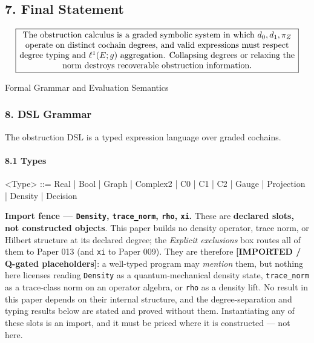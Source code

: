 \documentclass[
]{article}
\newenvironment{Shaded}{\begin{snugshade}}{\end{snugshade}}
\newcommand{\NormalTok}[1]{\textcolor[rgb]{0.12,0.11,0.11}{#1}}
\renewenvironment{quote}
  {\begin{leftbar}\small}
  {\end{leftbar}}
\begin{document}
\subsection{7. Final Statement}\label{final-statement}

\[
\fbox{\parbox{0.95\textwidth}{\centering The obstruction calculus is a graded symbolic system in which $d_0, d_1, \pi_Z$ operate on distinct cochain degrees, and valid expressions must respect degree typing and $\ell^1(E; g)$ aggregation. Collapsing degrees or relaxing the norm destroys recoverable obstruction information.}}
\]

Formal Grammar and Evaluation Semantics

\subsubsection{8. DSL Grammar}\label{dsl-grammar}

The obstruction DSL is a typed expression language over graded cochains.

\paragraph{8.1 Types}\label{types}

\begin{Shaded}
\begin{Highlighting}[]
\NormalTok{\textless{}Type\textgreater{} ::=}
\NormalTok{    Real}
\NormalTok{  | Bool}
\NormalTok{  | Graph}
\NormalTok{  | Complex2}
\NormalTok{  | C0}
\NormalTok{  | C1}
\NormalTok{  | C2}
\NormalTok{  | Gauge}
\NormalTok{  | Projection}
\NormalTok{  | Density}
\NormalTok{  | Decision}
\end{Highlighting}
\end{Shaded}

\begin{quote}
\textbf{Import fence --- \texttt{Density}, \texttt{trace\_norm}, \texttt{rho}, \texttt{xi}.} These are \textbf{declared slots, not constructed objects}. This paper builds no density operator, trace norm, or Hilbert structure at its declared degree; the \emph{Explicit exclusions} box routes all of them to Paper 013 (and \texttt{xi} to Paper 009). They are therefore \textbf{{[}IMPORTED / Q-gated placeholders{]}}: a well-typed program may \emph{mention} them, but nothing here licenses reading \texttt{Density} as a quantum-mechanical density state, \texttt{trace\_norm} as a trace-class norm on an operator algebra, or \texttt{rho} as a density lift. No result in this paper depends on their internal structure, and the degree-separation and typing results below are stated and proved without them. Instantiating any of these slots is an import, and it must be priced where it is constructed --- not here.
\end{quote}
\end{document}
